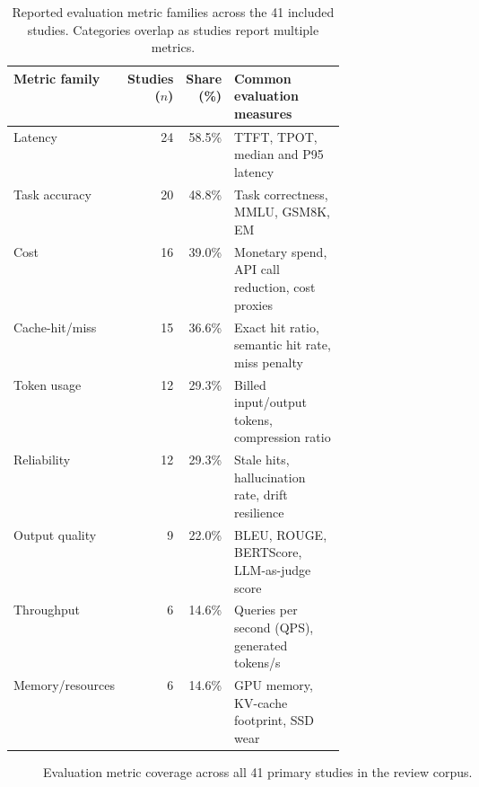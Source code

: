 \IfFileExists{jair.cls}{\documentclass{jair}}{\documentclass[manuscript,nonacm,screen]{acmart}}
\begin{document}
\begin{table}[t]
\caption{Reported evaluation metric families across the 41 included studies. Categories overlap as studies report multiple metrics.}
\label{tab:metrics}
\centering
\small
\begin{tabularx}{\linewidth}{>{\RaggedRight\arraybackslash}X r r >{\RaggedRight\arraybackslash}p{0.43\linewidth}}
\toprule
Metric family & Studies ($n$) & Share (\%) & Common evaluation measures \\
\midrule
Latency & 24 & 58.5\% & TTFT, TPOT, median and P95 latency \\
Task accuracy & 20 & 48.8\% & Task correctness, MMLU, GSM8K, EM \\
Cost & 16 & 39.0\% & Monetary spend, API call reduction, cost proxies \\
Cache-hit/miss & 15 & 36.6\% & Exact hit ratio, semantic hit rate, miss penalty \\
Token usage & 12 & 29.3\% & Billed input/output tokens, compression ratio \\
Reliability & 12 & 29.3\% & Stale hits, hallucination rate, drift resilience \\
Output quality & 9 & 22.0\% & BLEU, ROUGE, BERTScore, LLM-as-judge score \\
Throughput & 6 & 14.6\% & Queries per second (QPS), generated tokens/s \\
Memory/resources & 6 & 14.6\% & GPU memory, KV-cache footprint, SSD wear \\
\bottomrule
\end{tabularx}
\end{table}

\begin{figure}[t]
\centering
{}
\caption{Evaluation metric coverage across all 41 primary studies in the review corpus.}
\label{fig:metric-coverage}
\end{figure}
\end{document}
